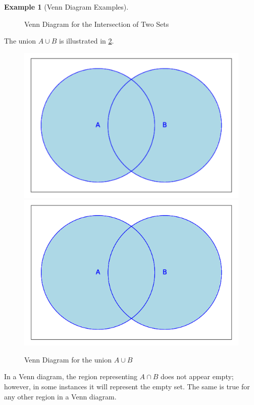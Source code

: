 \documentclass[10pt,]{book}
\theoremstyle{plain}
\theoremstyle{definition}
\theoremstyle{definition}
\theoremstyle{definition}
\newtheorem{example}[theorem]{Example}
\theoremstyle{definition}
\begin{document}
\begin{example}[Venn Diagram Examples]
\begin{figure}
\caption{Venn Diagram for the Intersection of Two Sets\label{venn_diagram_intersection}}
\end{figure}
\par
 The union \(A \cup  B\) is illustrated in \hyperref[venn_diagram_union]{\ref{venn_diagram_union}}.%
\leavevmode%
\begin{figure}
\centering
{}%
{\includegraphics[width=1\linewidth]{images/sageplot-venn-union.pdf}}%
{\includegraphics[width=1\linewidth]{images/sageplot-venn-union.png}}
\caption{Venn Diagram for the union \(A \cup  B\) \label{venn_diagram_union}}
\end{figure}
\par
In a Venn diagram, the region representing \(A \cap  B\) does not appear empty; however, in some instances it will represent the empty set. The same is true for any other region in a Venn diagram. 
%
\end{example}
\end{document}
